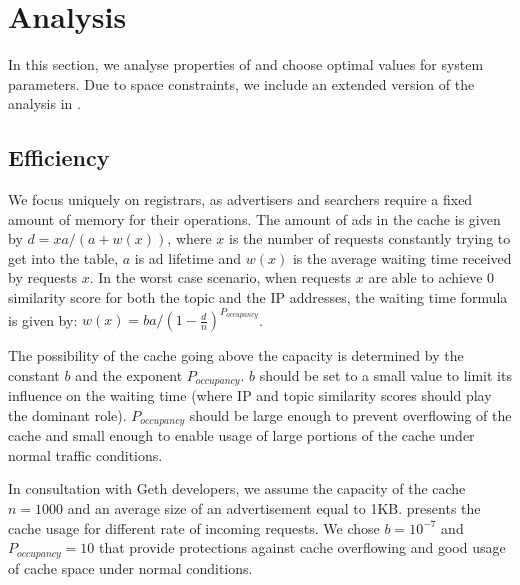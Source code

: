 \section{Analysis}\label{sec:analysis}
In this section, we analyse properties of \sysname and choose optimal values for system parameters. Due to space constraints, we include an extended version of the analysis in .
\subsection{Efficiency}

We focus uniquely on registrars, as advertisers and searchers require a fixed amount of memory for their operations. The amount of ads in the cache is given by $d = xa/(a + w(x))$, where $x$ is the number of requests constantly trying to get into the table, $a$ is ad lifetime and $w(x)$ is the average waiting time received by requests $x$.
In the worst case scenario, when requests $x$ are able to achieve 0 similarity score for both the topic and the IP addresses, the waiting time formula is given by: $w(x) = ba/(1 - \frac{d}{n})^{P_\textit{occupancy}}$.

The possibility of the cache going above the capacity is determined by the constant $b$ and the exponent $P_\textit{occupancy}$. $b$ should be set to a small value to limit its influence on the waiting time (where IP and topic similarity scores should play the dominant role). $P_\textit{occupancy}$ should be large enough to prevent overflowing of the cache and small enough to enable usage of large portions of the cache under normal traffic conditions. 

In consultation with Geth developers, we assume the capacity of the cache $n = 1000$ and an average size of an advertisement equal to 1KB.  presents the cache usage for different rate of incoming requests. We chose $b=10^{-7}$ and $P_\textit{occupancy}=10$ that provide protections against cache overflowing and good usage of cache space under normal conditions. 

